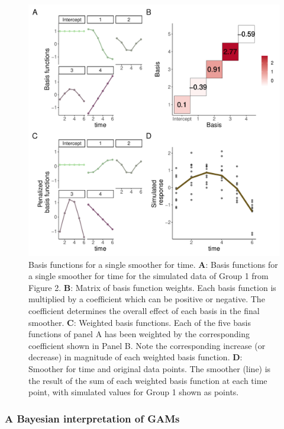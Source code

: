 \documentclass[
]{article}
\begin{document}
\begin{figure}

{\centering \includegraphics[width=0.75\linewidth]{Full_document_SIM_No_Appendix_files/figure-latex/basis-plot-1} 

}

\caption{Basis functions for a single smoother for time. \textbf{A}: Basis functions for a single smoother for time for the simulated data of Group 1 from Figure 2. \textbf{B}: Matrix of basis function weights. Each basis function is multiplied by a coefficient which can be positive or negative. The coefficient determines the overall effect of each basis in the final smoother. \textbf{C}: Weighted basis functions. Each of the five basis functions of panel A has been weighted by the corresponding coefficient shown in Panel B. Note the corresponding increase (or decrease) in magnitude of each weighted basis function. \textbf{D}: Smoother for time and original data points. The smoother (line) is the result of the sum of each weighted basis function at each time point, with simulated values for Group 1 shown as points.}\label{fig:basis-plot}
\end{figure}

\hypertarget{a-bayesian-interpretation-of-gams}{%
\subsubsection{A Bayesian interpretation of GAMs}\label{a-bayesian-interpretation-of-gams}}
\end{document}

